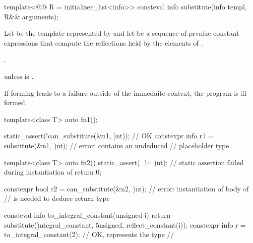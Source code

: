 %
\begin{itemdecl}
template<@@ R = initializer_list<info>>
  consteval info substitute(info templ, R&& arguments);
\end{itemdecl}

\begin{itemdescr}
\pnum
Let  be the template represented by 
and let  be a sequence of prvalue constant expressions
that compute the reflections held by the elements of .

\pnum
\returns
{}.

\pnum
\throws
{} unless
 is .

\pnum
\begin{note}
If forming  leads to a failure outside of the immedaite context,
the program is ill-formed.
\end{note}

\pnum
\begin{example}
\begin{codeblock}
template<class T>
  auto fn1();

static_assert(!can_substitute(^^fn1, {^^int}));         // OK
constexpr info r1 = substitute(^^fn1, {^^int});         // error:  contains an undeduced
                                                        // placeholder type

template<class T>
  auto fn2() {
    static_assert(^^T != ^^int);    // static assertion failed during instantiation of 
    return 0;
  }

constexpr bool r2 = can_substitute(^^fn2, {^^int});     // error: instantiation of body of 
                                                        // is needed to deduce return type
\end{codeblock}
\end{example}

\pnum
\begin{example}
\begin{codeblock}
consteval info to_integral_constant(unsigned i) {
  return substitute(^^integral_constant, {^^unsigned, reflect_constant(i)});
}
constexpr info r = to_integral_constant(2);     // OK,  represents the type
                                                // 
\end{codeblock}
\end{example}
\end{itemdescr}

